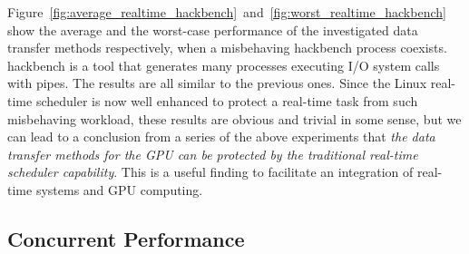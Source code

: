 Figure~\ref{fig:average_realtime_hackbench}~and~\ref{fig:worst_realtime_hackbench}
show the average and the worst-case performance of the investigated data
transfer methods respectively, when a misbehaving \textsf{hackbench}
process coexists.
\textsf{hackbench} is a tool that generates many processes executing I/O
system calls with pipes.
The results are all similar to the previous ones.
Since the Linux real-time scheduler is now well enhanced to protect a
real-time task from such misbehaving workload, these results are obvious
and trivial in some sense, but we can lead to a conclusion from a series
of the above experiments that \textit{the data transfer methods for the
GPU can be protected by the traditional real-time scheduler capability}.
This is a useful finding to facilitate an integration of real-time
systems and GPU computing.

\subsection{Concurrent Performance}

